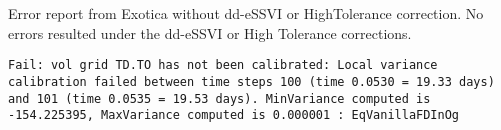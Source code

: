 \documentclass[11pt,letterpaper]{article}
\begin{document}

\begin{center}
Error report from Exotica without dd-eSSVI or HighTolerance correction. No errors resulted under the dd-eSSVI or High Tolerance corrections.

\texttt{Fail: vol grid TD.TO has not been calibrated: Local variance calibration failed between time steps 100 (time 0.0530 = 19.33 days) and 101 (time 0.0535 = 19.53 days). MinVariance computed is -154.225395, MaxVariance computed is 0.000001 : EqVanillaFDInOg }
\end{center}
\end{document}
